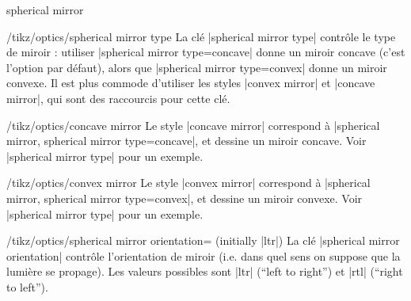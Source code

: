 \documentclass[a4paper]{ltxdoc}
\begin{document}
\begin{shape}{spherical mirror}
\begin{key}{/tikz/optics/spherical mirror type}
    La clé |spherical mirror type| contrôle le type de miroir : utiliser |spherical mirror type=concave| donne un miroir concave (c'est l'option par défaut), alors que |spherical mirror type=convex| donne un miroir convexe.
    Il est plus commode d'utiliser les styles |convex mirror| et |concave mirror|, qui sont des raccourcis pour cette clé.

\begin{codeexample}[width=5cm]
\end{codeexample}
\end{key}

\begin{stylekey}{/tikz/optics/concave mirror}
    Le style |concave mirror| correspond à |spherical mirror, spherical mirror type=concave|, et dessine un miroir concave. Voir |spherical mirror type| pour un exemple.
\end{stylekey}

\begin{stylekey}{/tikz/optics/convex mirror}
    Le style |convex mirror| correspond à |spherical mirror, spherical mirror type=convex|, et dessine un miroir convexe. Voir |spherical mirror type| pour un exemple.
\end{stylekey}


\begin{key}{/tikz/optics/spherical mirror orientation= (initially |ltr|)}
    La clé |spherical mirror orientation| contrôle l'orientation de miroir (i.e. dans quel sens on suppose que la lumière se propage). Les valeurs possibles sont |ltr| (\enquote{left to right}) et |rtl| (\enquote{right to left}).

\begin{codeexample}[width=5cm]
\end{codeexample}
\end{key}


\end{shape}
\end{document}
